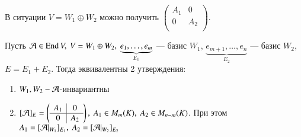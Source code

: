 \documentclass[main]{subfiles}
\begin{document}
В ситуации $V = W_1 \oplus W_2$ можно получить $\left(\begin{array}{c|c}
            A_1 & 0   \\ \hline
            0   & A_2 \\
        \end{array}\right)$.

\begin{proposition}
    Пусть $\mathcal{A} \in \operatorname{End} V,\ V=W_1 \oplus W_2,\
        \underbrace{e_1, \ldots , e_m}_{E_1}$
    — базис $W_1$, $\underbrace{e_{m+1}, \ldots , e_{n}}_{E_2}$
    — базис $W_2$, $E = E_1+E_2$. Тогда эквивалентны 2 утверждения:
    \begin{enumerate}
        \item $ W_1, W_2 - \mathcal{A} $-инвариантны
        \item $[\mathcal{A}]_E = \left(\begin{array}{c|c}
                          A_1 & 0   \\
                          \hline
                          0   & A_2 \\
                      \end{array}\right),\ A_1 \in M_m(K),\ A_2 \in M_{n-m}(K)$.
              При этом $A_1 = [\mathcal{A}|_{W_1}]_{E_1},\ A_2 = [\mathcal{A}|_{W_2}]_{E_2}$
    \end{enumerate}
\end{proposition}
\end{document}
